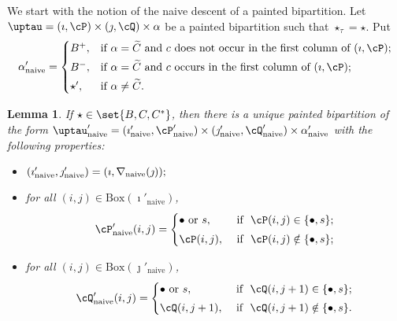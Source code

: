 \documentclass[12pt]{amsart}
\def\DD{\nabla}
\numberwithin{equation}{section}
\newtheorem{lem}[thm]{Lemma}
\theoremstyle{remark}
\def\DD{\nabla}
\def\BOX#1{\mathrm{Box}(#1)}
\def\tnaive{\mathrm{naive}}
\def\cPpn{\cP'_\mathrm{naive}}
\def\cQpn{\cQ'_\mathrm{naive}}
\def\uptaupn{\uptau'_{\tnaive}}
\def\alphapn{\alpha'_{\tnaive}}
\def\imathpn{\imath'_{\tnaive}}
\def\jmathpn{\jmath'_{\tnaive}}
\def\DD{\nabla}
\begin{document}
We start with the notion of the naive descent of a painted bipartition. Let $\uptau=(\imath,\cP)\times (\jmath,\cQ)\times \alpha$ be a painted bipartition such that $\star_\tau=\star$. Put
  \begin{equation} \label{eq:def.alphap}
    \alphapn=\begin{cases} B^+,
  & \textrm{if $\alpha=\widetilde{C}$ and $c$ does not occur in the first column of $(\imath,\cP)$}; \smallskip \\
  B^-,
  & \textrm{if $\alpha=\widetilde{C}$ and  $c$ occurs in the first column of $(\imath,\cP)$}; \smallskip \\
  \star', & \textrm{if $\alpha\neq \widetilde C$}.
  \end{cases}
  \end{equation}

\begin{lem}\label{lemDDn1}
  If $\star \in \set{B,C,C^*}$, then there is a unique painted bipartition of the form $\uptaupn= (\imathpn,\cPpn)\times (\jmathpn,\cQpn)\times \alphapn$ with the following properties:
  \begin{itemize}
        \item $
   (\imathpn,\jmathpn)= (\imath,\DD_\mathrm{naive}(\jmath)); \smallskip
   $
   \item for all $(i,j)\in \BOX{\imathpn}$,
   \[
     \cPpn(i,j)=\begin{cases}
    \bullet \textrm{ or } s,&\textrm{ if  $\ \cP(i,j)\in \{\bullet, s\}$;} \smallskip \\
  \cP(i,j),& \textrm{ if $\ \cP(i,j)\notin \{\bullet, s\}$};\end{cases}
   \]
   \item for all $(i,j)\in \BOX{\jmathpn}$,
   \[
     \cQpn(i,j)=\begin{cases}
    \bullet \textrm{ or } s,&\textrm{ if  $\ \cQ(i,j+1)\in \{\bullet, s\}$;} \smallskip \\
  \cQ(i,j+1), & \textrm{ if $\ \cQ(i,j+1)\notin \{\bullet, s\}$}.  \end{cases}
   \]
    \end{itemize}
    \end{lem}
\end{document}
